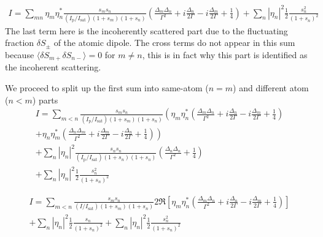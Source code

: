 \documentclass[11pt,letter]{article}
\begin{document}
\begin{multline}
 I  = 
  \sum_{mn}  \eta_{m}\eta_{n}^{*}
    \frac{ s_{m} s_{n} } { (I_{\mathrm{p}}/I_{\mathrm{sat}}) ( 1+s_{m} )( 1+s_{n} ) }
    \left(
        \frac{ \Delta_{m} \Delta_{n} }{ \Gamma^{2} } 
      + i \frac{ \Delta_{n} }{ 2 \Gamma } 
      - i \frac{ \Delta_{m} }{ 2 \Gamma } 
      + \frac{1}{4}  
    \right)  
   + \sum_{n} | \eta_{n}|^{2} \frac{1}{2} \frac{ s_{n}^{2} } { (1 + s _{n} )^{2} } 
\end{multline}
The last term here is the incoherently scattered part due to the fluctuating
fraction $\delta S_{\pm}$ of the atomic dipole.  The cross terms do not appear
in this sum because $\langle \delta S_{m+} \delta S_{n-}\rangle =0$ for $m\neq
n$,  this is in fact why this part is identified as the incoherent scattering. 

We proceed to split up the first sum into same-atom ($n=m$) and different atom
($n<m$) parts 
\begin{multline}
 I  = 
  \sum_{m<n} 
    \frac{ s_{m} s_{n} } { (I_{\mathrm{p}}/I_{\mathrm{sat}}) ( 1+s_{m} )( 1+s_{n} ) }
    \left(
        \eta_{m}\eta_{n}^{*}
    \left(
        \frac{ \Delta_{m} \Delta_{n} }{ \Gamma^{2} } 
      + i \frac{ \Delta_{n} }{ 2 \Gamma } 
      - i \frac{ \Delta_{m} }{ 2 \Gamma } 
      + \frac{1}{4}  
    \right)  \right. \\
   \left.  + 
        \eta_{n}\eta_{m}^{*}
    \left(
        \frac{ \Delta_{n} \Delta_{m} }{ \Gamma^{2} } 
      + i \frac{ \Delta_{m} }{ 2 \Gamma } 
      - i \frac{ \Delta_{n} }{ 2 \Gamma } 
      + \frac{1}{4}  
    \right) 
    \right)  \\
  + \sum_{n}  |\eta_{n}|^{2}
    \frac{ s_{n} s_{n} } { (I_{\mathrm{p}}/I_{\mathrm{sat}}) ( 1+s_{n} )( 1+s_{n} ) }
    \left(
        \frac{ \Delta_{n} \Delta_{n} }{ \Gamma^{2} } 
      + \frac{1}{4}  
    \right) \\ 
   + \sum_{n} | \eta_{n}|^{2} \frac{1}{2} \frac{ s_{n}^{2} } { (1 + s _{n} )^{2} } 
\end{multline}

\begin{multline}
 I  = 
  \sum_{m<n} 
    \frac{ s_{m} s_{n} } { (I/I_{\mathrm{sat}}) ( 1+s_{m} )( 1+s_{n} ) }
    2 \Re\left[ 
        \eta_{m}\eta_{n}^{*}
    \left(
        \frac{ \Delta_{m} \Delta_{n} }{ \Gamma^{2} } 
      + i \frac{ \Delta_{n} }{ 2 \Gamma } 
      - i \frac{ \Delta_{m} }{ 2 \Gamma } 
      + \frac{1}{4}  
    \right) \right] \\
  + \sum_{n}  |\eta_{n}|^{2}
    \frac{1}{2}	\frac{ s_{n} } { ( 1+s_{n} )^{2} }
   + \sum_{n} | \eta_{n}|^{2} \frac{1}{2} \frac{ s_{n}^{2} } { (1 + s _{n} )^{2} } 
\end{multline}
\end{document}

